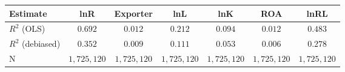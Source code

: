 \begin{tabular}{l*{6}{c}}
\hline\hline
 Estimate & lnR & Exporter & lnL & lnK & ROA & lnRL \\
\hline
\addlinespace $ R^2$ (OLS) & $0.692$ & $0.012$ & $0.212$ & $0.094$ & $0.012$ & $0.483$ \\
$ R^2$ (debiased) & $0.352$ & $0.009$ & $0.111$ & $0.053$ & $0.006$ & $0.278$ \\
N & $1,725,120$ & $1,725,120$ & $1,725,120$ & $1,725,120$ & $1,725,120$ & $1,725,120$ \\
\hline\hline
\end{tabular}
